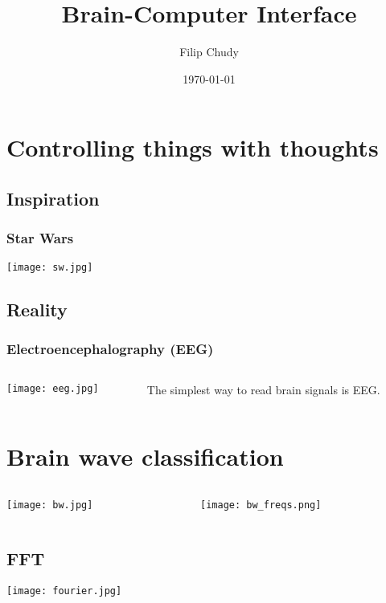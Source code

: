\documentclass{beamer}
\begin{document}
\title{Brain-Computer Interface}
\author{Filip Chudy}
\date{\today} 


\begin{frame}
\titlepage
\end{frame}

\section{Controlling things with thoughts}
\subsection{Inspiration}
\begin{frame} \frametitle{Star Wars}
\texttt{[image: sw.jpg]}
\end{frame}

\subsection{Reality}
\begin{frame} \frametitle{Electroencephalography (EEG)}
\begin{columns}
\begin{column}{5cm}
\texttt{[image: eeg.jpg]}
\end{column}
\begin{column}{5cm}
The simplest way to read brain signals is EEG.
\end{column}
\end{columns}
\end{frame}

\section{Brain wave classification}
\begin{frame}
\begin{columns}
\begin{column}{5cm}
\texttt{[image: bw.jpg]}
\end{column}
\begin{column}{5cm}
\texttt{[image: bw\_freqs.png]}
\end{column}
\end{columns} 
\end{frame}

\subsection{FFT}
\begin{frame}
\texttt{[image: fourier.jpg]}
\end{frame}
\end{document}
